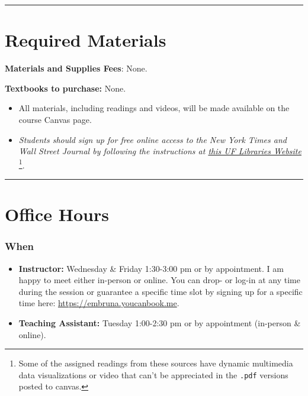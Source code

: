 \documentclass[
  10pt,
  letterpaper,
  oneside,
  open=any]{scrbook}
\begin{document}
\begin{center}\rule{0.5\linewidth}{0.5pt}\end{center}


\chapter{Required Materials}\label{required-materials}

\textbf{Materials and Supplies Fees}: None.

\textbf{Textbooks to purchase:} None.

\begin{itemize}
\item
  All materials, including readings and videos, will be made available
  on the course Canvas page. \bigskip
\item
  \emph{Students should sign up for free online access to the New York
  Times and Wall Street Journal by following the instructions at
  \href{https://businesslibrary.uflib.ufl.edu/c.php?g=943928&p=7708734}{this
  UF Libraries Website}} \footnote{Some of the assigned readings from
    these sources have dynamic multimedia data visualizations or video
    that can't be appreciated in the \texttt{.pdf} versions posted to
    canvas.}.
\end{itemize}

\begin{center}\rule{0.5\linewidth}{0.5pt}\end{center}


\chapter{Office Hours}\label{office-hours}

\subsection*{When}\label{when}

\begin{itemize}
\item
  \textbf{Instructor:} Wednesday \& Friday 1:30-3:00 pm or by
  appointment. I am happy to meet either in-person or online. You can
  drop- or log-in at any time during the session or guarantee a specific
  time slot by signing up for a specific time here:
  \url{https://embruna.youcanbook.me}.
\item
  \textbf{Teaching Assistant:} Tuesday 1:00-2:30 pm or by appointment
  (in-person \& online).
\end{itemize}
\end{document}
